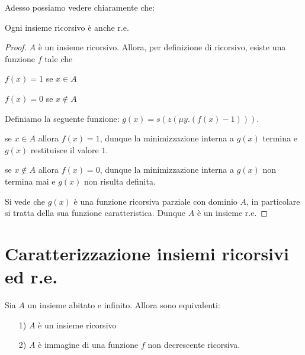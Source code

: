Adesso possiamo vedere chiaramente che:

\begin{thm}
\label{thm:1}
Ogni insieme ricorsivo \`e anche r.e.

\end{thm}

\begin{proof}

$A$ \`e un insieme ricorsivo. Allora, per definizione di ricorsivo, esiste una funzione $f$ tale che

$f(x)=1$ se $x \in A$

$f(x)=0$ se $ x \notin A$

Definiamo la seguente funzione: $g(x)=s(z(\mu y.(f(x)-1)))$.

se $x \in A$ allora $f(x)=1$, dunque la minimizzazione interna a $g(x)$ termina e $g(x)$ restituisce il valore $1$.

se $x \notin A$ allora $f(x)=0$, dunque la minimizzazione interna a $g(x)$ non termina mai e $g(x)$ non risulta definita.

Si vede che $g(x)$ \`e una funzione ricorsiva parziale con dominio $A$, in particolare si tratta della sua funzione caratteristica. Dunque $A$ \`e un insieme r.e.

\end{proof}

\section{Caratterizzazione insiemi ricorsivi ed r.e.}

\begin{thm}
\label{thm:3}
Sia $A$ un insieme abitato e infinito. Allora sono equivalenti:

\begin{itemize}
\item [1)] $A$ \`e un insieme ricorsivo 

\item [2)] $A$ \`e immagine di una funzione $f$ non decrescente ricorsiva.
\end{itemize}

\end{thm}

